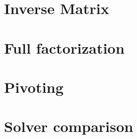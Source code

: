 \documentclass[fontsize = 10pt,DIV = 13]{scrartcl}
\begin{document}
\begin{comment}


\subsection{Notation}

This document uses bold symbols for matrices and vectors.
Bold capital letters like $\mathbf{A}$ are used for matrices.
Lower case bold letters are used for vectors ($\mathbf{r}$, $\mathbf{x}$).
The individual elements of a vector are given by:

\begin{align*}
\mathbf{x}
=
\begin{bmatrix}
x_0\\
x_1\\
\vdots\\
x_{N-1}
\end{bmatrix}
\end{align*}

Zero based indexing is used since this makes it easier to translate the equations into C++ code.


The individual components of the matrix $\mathbf{A}$ can be distinguished by a single column specific character and a zero based row index.
The column specific characters start with the character $a$ for the first column and increase alphabetically.
For example, the components of $\mathbf{A}$ with size $3 \times 3$ are:

\begin{align*}
\mathbf{A}
=
\begin{bmatrix}
a_0&b_0&c_0\\
a_1&b_1&c_1\\
a_2&b_2&c_2
\end{bmatrix}
\end{align*}

This element naming is chosen because it can be easier translated into vectorized code than the common double index notation.
\end{comment}













\section{Inverse Matrix}
\label{sec:InverseMatrix}

\section{Full factorization}
\label{sec:fullFactorization}

\section{Pivoting}
\label{sec:pivoting}


\section{Solver comparison}
\label{sec:solverSelection}
\end{document}
